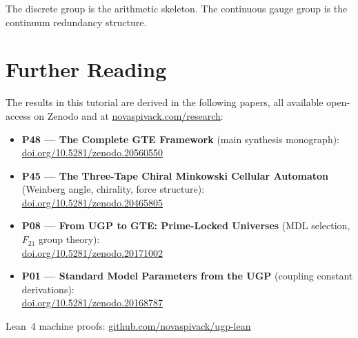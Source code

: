 \documentclass[11pt,a4paper]{article}
\begin{document}
The discrete group is the arithmetic skeleton.
The continuous gauge group is the continuum redundancy structure.

\section*{Further Reading}
\begin{tcolorbox}[colback=orange!8,colframe=orange!50!black,
  title=\textbf{Primary Sources}]
The results in this tutorial are derived in the following papers,
all available open-access on Zenodo and at
\href{https://novaspivack.com/research}{novaspivack.com/research}:
\begin{itemize}[itemsep=2pt]
  \item \textbf{P48 --- The Complete GTE Framework} (main synthesis monograph):\\
        \href{https://doi.org/10.5281/zenodo.20560550}{doi.org/10.5281/zenodo.20560550}
  \item \textbf{P45 --- The Three-Tape Chiral Minkowski Cellular Automaton}
        (Weinberg angle, chirality, force structure):\\
        \href{https://doi.org/10.5281/zenodo.20465805}{doi.org/10.5281/zenodo.20465805}
  \item \textbf{P08 --- From UGP to GTE: Prime-Locked Universes}
        (MDL selection, $F_{21}$ group theory):\\
        \href{https://doi.org/10.5281/zenodo.20171002}{doi.org/10.5281/zenodo.20171002}
  \item \textbf{P01 --- Standard Model Parameters from the UGP}
        (coupling constant derivations):\\
        \href{https://doi.org/10.5281/zenodo.20168787}{doi.org/10.5281/zenodo.20168787}
\end{itemize}
Lean~4 machine proofs: \href{https://github.com/novaspivack/ugp-lean}{github.com/novaspivack/ugp-lean}
\end{tcolorbox}



\end{document}
